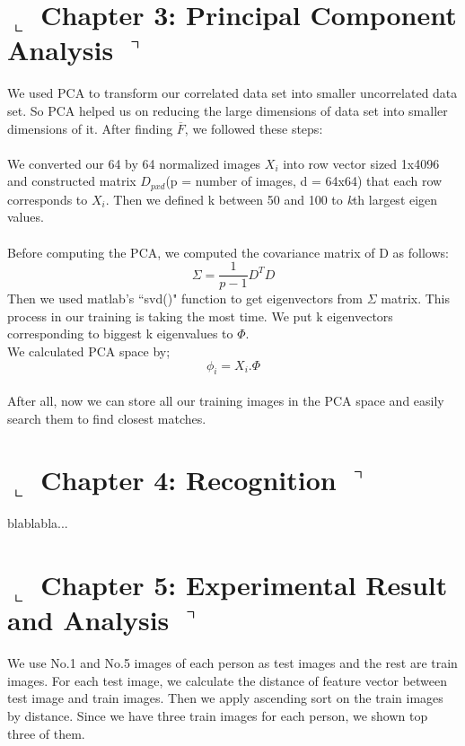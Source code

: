 \documentclass[]{article}
\begin{document}
\section*{ $\llcorner$  Chapter 3: Principal Component Analysis $\urcorner$}
  We used PCA to transform our correlated data set into smaller uncorrelated data set. So PCA helped us on reducing the large dimensions of data set into smaller dimensions of it. After finding $ \overline{F} $, we followed these steps:\\
  \\
  We converted our 64 by 64 normalized images $X_{i}$  into row vector sized 1x4096 and constructed matrix $D_{pxd}$(p = number of images, d = 64x64) that each row corresponds to $X_{i}$. Then we defined k between 50 and 100 to \emph{k}th largest eigen values.\\
  \\Before computing the PCA, we computed the covariance matrix of D as follows:
  	$$ \Sigma = \frac{1}{p-1} D^{T} D $$
  	Then we used matlab's ``svd()" function to get eigenvectors from $ \Sigma $ matrix. This process in our training is taking the most time. We put k eigenvectors corresponding to biggest k eigenvalues to $\Phi$.
  	\\We calculated PCA space by;
  	$$ \phi_{i} = X_{i} . \Phi $$\\
  	
  	After all, now we can store all our training images in the PCA space and easily search them to find closest matches.
  

\section*{ $\llcorner$  Chapter 4: Recognition $\urcorner$}
blablabla...

\section*{ $\llcorner$  Chapter 5: Experimental Result and Analysis $\urcorner$}
We use No.1 and No.5 images of each person as test images and the rest are train images. For each test image, we calculate the distance of feature vector between test image and train images. Then we apply ascending sort on the train images by distance. Since we have three train images for each person, we shown top three of them.
\\
\end{document}
